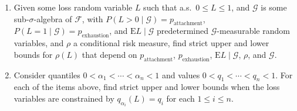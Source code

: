 \documentclass{amsart}
\theoremstyle{plain}
\theoremstyle{definition}
\theoremstyle{definition}
\theoremstyle{remark}
\begin{document}
\begin{enumerate}
\begin{enumerate}
        \end{enumerate}
    \item Given some loss random variable \(L\) such that a.s.\ \(0 \leq L \leq 1\), and \(\mathcal{G}\) is some sub-\(\sigma\)-algebra of \(\mathcal{F}\), with \(P \left(L > 0 \mid \mathcal{G}\right) = p_{\text{attachment}}\), \(P \left(L = 1 \mid \mathcal{G} \right) = p_{\text{exhaustion}}\), and \(\mathrm{E}L \mid \mathcal{G}\) predetermined \(\mathcal{G}\)-measurable random variables, and \(\rho\) a conditional risk measure, find strict upper and lower bounds for \(\rho \left(L\right)\) that depend on \(p_{\text{attachment}}\), \(p_{\text{exhaustion}}\), \(\mathrm{E}L \mid \mathcal{G}\), \(\rho\), and \(\mathcal{G}\).
\item Consider quantiles \(0<\alpha_{1}<\cdots<\alpha_{n}<1\) and values \(0<q_{1}<\cdots<q_{n}<1\). For each of the items above, find strict upper and lower bounds when the loss variables are constrained by \(q_{\alpha_{i}} \left(L\right) = q_{i}\) for each \(1 \leq i \leq n\).
\end{enumerate}

\printbibliography
\end{document}
